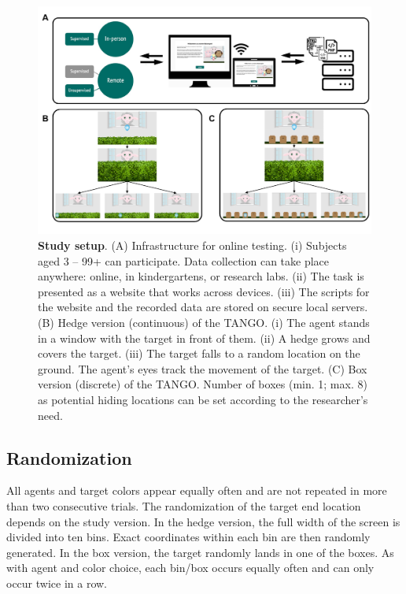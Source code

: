 \documentclass[
  man,floatsintext]{apa6}
\begin{document}
\begin{figure}

{\centering \includegraphics[width=1\linewidth]{../figures/tango_procedure} 

}

\caption{\textbf{Study setup}. (A) Infrastructure for online testing. (i) Subjects aged 3 -- 99+ can participate. Data collection can take place anywhere: online, in kindergartens, or research labs. (ii) The task is presented as a website that works across devices. (iii) The scripts for the website and the recorded data are stored on secure local servers. (B) Hedge version (continuous) of the TANGO. (i) The agent stands in a window with the target in front of them. (ii) A hedge grows and covers the target. (iii) The target falls to a random location on the ground. The agent's eyes track the movement of the target. (C) Box version (discrete) of the TANGO. Number of boxes (min. 1; max. 8) as potential hiding locations can be set according to the researcher's need.}\label{fig:fig1}
\end{figure}

\hypertarget{randomization}{%
\subsection{Randomization}\label{randomization}}

All agents and target colors appear equally often and are not repeated in more than two consecutive trials.
The randomization of the target end location depends on the study version.
In the hedge version, the full width of the screen is divided into ten bins.
Exact coordinates within each bin are then randomly generated.
In the box version, the target randomly lands in one of the boxes.
As with agent and color choice, each bin/box occurs equally often and can only occur twice in a row.
\end{document}
